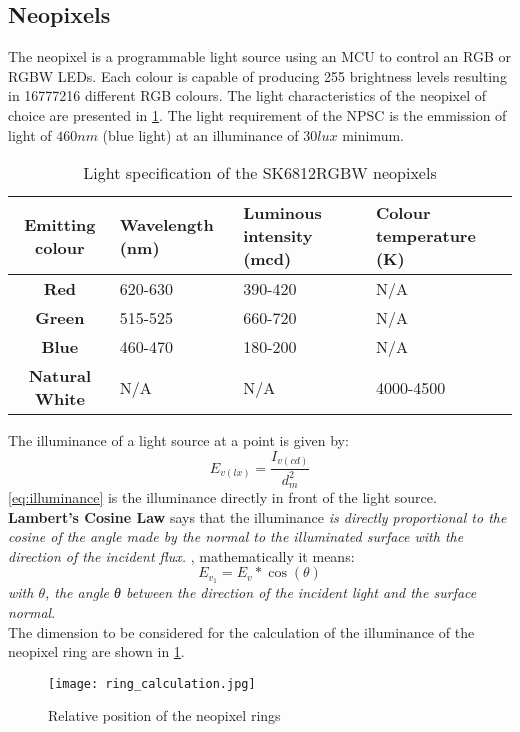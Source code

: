 \subsection{Neopixels}
The neopixel is a programmable light source using an MCU to control an RGB or RGBW LEDs. Each colour is capable of producing 255 brightness levels resulting in 16777216 different RGB colours. 
The light characteristics of the neopixel of choice are presented in \cref{table:neopixel_specs}. The light requirement of the NPSC is the emmission of light of $460nm$ (blue light) at an illuminance of $30lux$ minimum.
\begin{table}[h!]
\centering
\begin{tabular}{cp{6em}p{6em}p{6em}}
\hline
\hline
\textbf{Emitting colour} & \textbf{Wavelength (nm)} & \textbf{Luminous intensity (mcd)} & \textbf{Colour temperature (K)} \\ 
\hline
\textbf{Red} & 620-630 & 390-420 & N/A\\
\textbf{Green} & 515-525 & 660-720 & N/A  \\
\textbf{Blue} & 460-470 & 180-200 & N/A\\
\textbf{Natural White} & N/A & N/A & 4000-4500\\
\hline
\hline
\end{tabular}
\caption{Light specification of the SK6812RGBW neopixels}
\label{table:neopixel_specs}
\end{table}
The illuminance of a light source at a point is given by: 
\begin{equation}\label{eq:illuminance}
E_{v(lx)}=\frac{I_{v(cd)}}{d_m^2}
\end{equation}
\cref{eq:illuminance} is the illuminance directly in front of the light source. \textbf{Lambert's Cosine Law} says that the illuminance \textit{is directly proportional to the cosine of the angle made by the normal to the illuminated surface with the direction of the incident flux.} \cite{optical}, mathematically it means:
\begin{equation}\label{eq:lambert}
E_{v_1}=E_v*\cos(\theta)
\end{equation}
\textit{with $\theta$, the angle θ between the direction of the incident light and the surface normal}.\\
The dimension to be considered for the calculation of the illuminance of the neopixel ring are shown in \cref{fig:neopixel_ring_dimension}.
\begin{figure}[h!]
\centering
\texttt{[image: ring\_calculation.jpg]}
\caption{Relative position of the neopixel rings}
\label{fig:neopixel_ring_dimension}
\end{figure}
